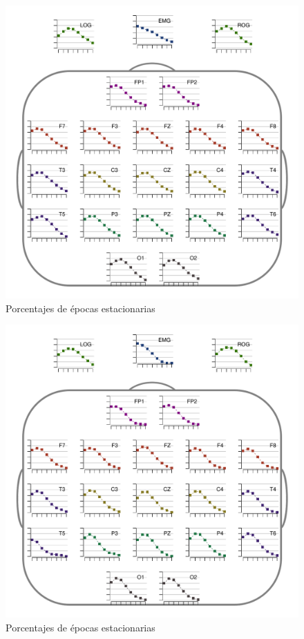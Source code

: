 \begin{figure}
\centering
\includegraphics[width=.9\linewidth]{./img_resultados/MJNNVIGILOS_cabeza_epocas_.pdf}
\caption{Porcentajes de épocas estacionarias}
\end{figure}

\begin{figure}
\centering
\includegraphics[width=.9\linewidth]{./img_resultados/JANASUE_cabeza_epocas_.pdf}
\caption{Porcentajes de épocas estacionarias}
\end{figure}

